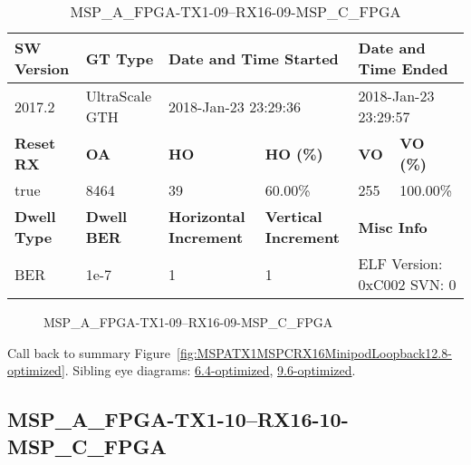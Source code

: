 \begin{table}[h]
\centering
\caption{MSP\_A\_FPGA-TX1-09--RX16-09-MSP\_C\_FPGA}
\label{tab:MSPAFPGATX109RX1609MSPCFPGA12.8-optimized}
\begin{tabular}{@{}|l|l|l|l|l|l|@{}}
\toprule
\textbf{SW Version}                & \textbf{GT Type}   & \multicolumn{2}{l|}{\textbf{Date and Time Started}}            & \multicolumn{2}{l|}{\textbf{Date and Time Ended}}        \\ \midrule
2017.2                       & UltraScale GTH          & \multicolumn{2}{l|}{2018-Jan-23 23:29:36}                   & \multicolumn{2}{l|}{2018-Jan-23 23:29:57}               \\ \midrule
\textbf{Reset RX}                  & \textbf{OA} & \textbf{HO}   & \textbf{HO (\%)} & \textbf{VO} & \textbf{VO (\%)} \\ \midrule
true & 8464        & 39          & 60.00\%        & 255        & 100.00\%       \\ \midrule
\textbf{Dwell Type}                & \textbf{Dwell BER} & \textbf{Horizontal Increment} & \textbf{Vertical Increment}    & \multicolumn{2}{l|}{\textbf{Misc Info}}                  \\ \midrule
BER                            & 1e-7        & 1        & 1           & \multicolumn{2}{l|}{ELF Version: 0xC002 SVN: 0}                         \\ \bottomrule
\end{tabular}
\end{table}

\begin{figure}[h]
\caption{MSP\_A\_FPGA-TX1-09--RX16-09-MSP\_C\_FPGA} \label{fig:MSPAFPGATX109RX1609MSPCFPGA12.8-optimized}
\end{figure}

Call back to summary Figure~\ref{fig:MSPATX1MSPCRX16MinipodLoopback12.8-optimized}.
Sibling eye diagrams: \hyperref[sec:MSPAFPGATX109RX1609MSPCFPGA6.4-optimized]{6.4-optimized}, \hyperref[sec:MSPAFPGATX109RX1609MSPCFPGA9.6-optimized]{9.6-optimized}.

\clearpage
\newpage


\subsection{MSP\_A\_FPGA-TX1-10--RX16-10-MSP\_C\_FPGA}\label{sec:MSPAFPGATX110RX1610MSPCFPGA12.8-optimized}

